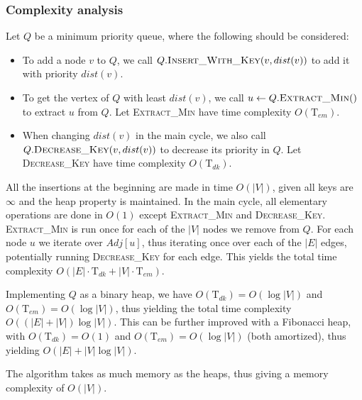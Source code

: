 \subsubsection{Complexity analysis}
Let $Q$ be a minimum priority queue, where the following should be considered:
\begin{itemize}
    \item To add a node $v$ to $Q$, we call $Q.\textsc{Insert\_With\_Key}(v, dist(v))$ to add it with priority $dist(v)$.
    \item To get the vertex of $Q$ with least $dist(v)$, we call $u \gets Q.\textsc{Extract\_Min}()$ to extract $u$ from $Q$. Let \textsc{Extract\_Min} have time complexity $O(\text{T}_{em})$.
    \item When changing $dist(v)$ in the main cycle, we also call $Q.\textsc{Decrease\_Key}(v, dist(v))$ to decrease its priority in $Q$. Let \textsc{Decrease\_Key} have time complexity $O(\text{T}_{dk})$.
\end{itemize}
All the insertions at the beginning are made in time $O(|V|)$, given all keys are $\infty$ and the heap property is maintained. In the main cycle, all elementary operations are done in $O(1)$ except \textsc{Extract\_Min} and \textsc{Decrease\_Key}. \textsc{Extract\_Min} is run once for each of the $|V|$ nodes we remove from $Q$. For each node $u$ we iterate over $Adj[u]$, thus iterating once over each of the $|E|$ edges, potentially running \textsc{Decrease\_Key} for each edge. This yields the total time complexity $O(|E|\cdot \text{T}_{dk}+|V|\cdot \text{T}_{em})$. \par
Implementing $Q$ as a binary heap, we have $O(\text{T}_{dk})=O(\log |V|)$ and $O(\text{T}_{em})=O(\log |V|)$, thus yielding the total time complexity $O((|E|+|V|)\log |V|)$. This can be further improved with a Fibonacci heap, with $O(\text{T}_{dk})=O(1)$ and $O(\text{T}_{em})=O(\log |V|)$ (both amortized), thus yielding $O(|E| + |V|\log |V|)$.\par
The algorithm takes as much memory as the heaps, thus giving a memory complexity of $O(|V|)$.
